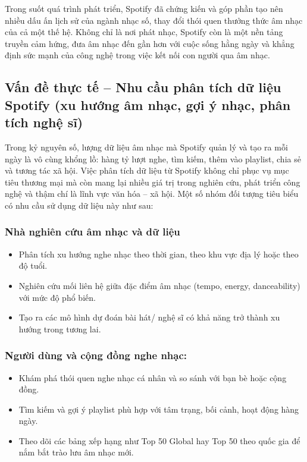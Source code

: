 \documentclass{../hcmut-report}
\begin{document}
Trong suốt quá trình phát triển, Spotify đã chứng kiến và góp phần tạo nên nhiều dấu ấn lịch sử của ngành nhạc số, thay đổi thói quen thưởng thức âm nhạc của cả một thế hệ. Không chỉ là nơi phát nhạc, Spotify còn là một nền tảng truyền cảm hứng, đưa âm nhạc đến gần hơn với cuộc sống hằng ngày và khẳng định sức mạnh của công nghệ trong việc kết nối con người qua âm nhạc.\\
\subsection{Vấn đề thực tế – Nhu cầu phân tích dữ liệu Spotify (xu hướng âm nhạc, gợi ý nhạc, phân tích nghệ sĩ)}
Trong kỷ nguyên số, lượng dữ liệu âm nhạc mà Spotify quản lý và tạo ra mỗi ngày là vô cùng khổng lồ: hàng tỷ lượt nghe, tìm kiếm, thêm vào playlist, chia sẻ và tương tác xã hội. Việc phân tích dữ liệu từ Spotify không chỉ phục vụ mục tiêu thương mại mà còn mang lại nhiều giá trị trong nghiên cứu, phát triển công nghệ và thậm chí là lĩnh vực văn hóa – xã hội. Một số nhóm đối tượng tiêu biểu có nhu cầu sử dụng dữ liệu này như sau:\\
\subsubsection{Nhà nghiên cứu âm nhạc và dữ liệu}
\begin{itemize}
    \item Phân tích xu hướng nghe nhạc theo thời gian, theo khu vực địa lý hoặc theo độ tuổi.

    \item Nghiên cứu mối liên hệ giữa đặc điểm âm nhạc (tempo, energy, danceability) với mức độ phổ biến.

    \item Tạo ra các mô hình dự đoán bài hát/ nghệ sĩ có khả năng trở thành xu hướng trong tương lai.
\end{itemize}
\subsubsection{Người dùng và cộng đồng nghe nhạc:}
\begin{itemize}
    \item Khám phá thói quen nghe nhạc cá nhân và so sánh với bạn bè hoặc cộng đồng.

    \item Tìm kiếm và gợi ý playlist phù hợp với tâm trạng, bối cảnh, hoạt động hàng ngày.
    
    \item Theo dõi các bảng xếp hạng như Top 50 Global hay Top 50 theo quốc gia để nắm bắt trào lưu âm nhạc mới.
\end{itemize}
\end{document}
